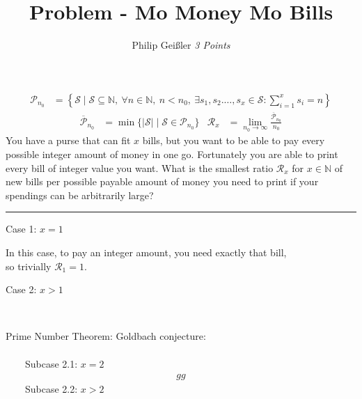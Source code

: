 \documentclass[12pt, a4paper]{article}
\newcommand{\rom}[1]{\uppercase\expandafter{\romannumeral #1\relax}}
\begin{document}
\title{Problem \rom{4} - Mo Money Mo Bills}
\author{Philip Gei\ss{}ler \hspace{5cm} \textit{3 Points}}
\date{}
\maketitle
\vspace*{-.9cm}

\begin{align*}
\mathcal{P}_{n_0} &= \left\lbrace{\mathcal{S}\mid \mathcal{S}\subseteq \mathbb{N},~ \forall n\in\mathbb{N},~ n<n_0,~ \exists s_1,s_2.\dots,s_x \in \mathcal{S}: \textstyle\sum_{i=1}^xs_i=n}\right\rbrace
\end{align*}\vspace*{-0.9cm}\begin{align*}
\overline{\mathcal{P}}_{n_0} &= \min\{|\mathcal{S}| \mid \mathcal{S}\in\mathcal{P}_{n_0}\} &\mathcal{R}_x &= \lim_{{n_0}\rightarrow \infty} \frac{\overline{\mathcal{P}}_{n_0}}{n_0}
\end{align*}
You have a purse that can fit $x$ bills, but you want to be able to pay every possible integer amount of money in one go. Fortunately you are able to print every bill of integer value you want. What is the smallest ratio $\mathcal{R}_x$ for $x\in\mathbb{N}$ of new bills per possible payable amount of money you need to print if your spendings can be arbitrarily large?
\hrule
\vspace*{9mm}
Case 1: $x = 1$
\begin{center}
In this case, to pay an integer amount, you need exactly that bill,\\
so trivially $\mathcal{R}_1 = 1$.
\end{center}

Case 2: $x > 1$\\
\begin{minipage}[t]{0.12\linewidth}
~~
\end{minipage}
\begin{minipage}[t]{0.84\linewidth}
Prime Number Theorem:
Goldbach conjecture:
\end{minipage}
\begin{align*}
\end{align*}
~~~~Subcase 2.1: $x = 2$
\begin{align*}
gg
\end{align*}
~~~~Subcase 2.2: $x > 2$
\begin{center}

\end{center}
\end{document}

